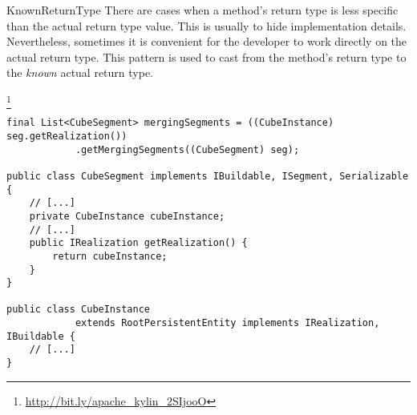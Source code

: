 \begin{pattern}{KnownReturnType}
There are cases when a method's return type is less specific than the
actual return type value.
This is usually to hide implementation details.
Nevertheless, sometimes it is convenient for the developer to work
directly on the actual return type.
This pattern is used to cast from the method's return type to
the \emph{known} actual return type.

\instances{}

\footnote{\url{http://bit.ly/apache_kylin_2SIjooO}}

\begin{verbatim}
final List<CubeSegment> mergingSegments = ((CubeInstance) seg.getRealization())
            .getMergingSegments((CubeSegment) seg);

public class CubeSegment implements IBuildable, ISegment, Serializable {
    // [...]
    private CubeInstance cubeInstance;
    // [...]
    public IRealization getRealization() {
        return cubeInstance;
    }
}

public class CubeInstance
            extends RootPersistentEntity implements IRealization, IBuildable {
    // [...]
}
\end{verbatim}

\detection{}

\discussion{}

\related{}

\end{pattern}